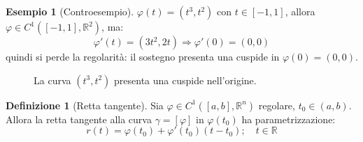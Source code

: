 \documentclass[11pt, a4paper, openright]{book}
\theoremstyle{plain}
\theoremstyle{definition}
\newtheorem{definizione}[teorema]{Definizione}
\newtheorem{esempio}[teorema]{Esempio}
\theoremstyle{remark}
\begin{document}
\begin{esempio}[Controesempio]
    $\varphi(t) = (t^3, t^2)$ con $t \in [-1, 1]$, allora $\varphi \in C^1([-1, 1], \mathbb{R}^2)$, ma:
    \begin{equation}
        \varphi'(t) = (3t^2, 2t) \Longrightarrow \varphi'(0) = (0, 0)
    \end{equation}
    quindi si perde la regolarità: il sostegno presenta una cuspide in $\varphi(0) = (0, 0)$.
\begin{figure}[H]
    \centering
    \caption{La curva $(t^3, t^2)$ presenta una cuspide nell'origine.}
\end{figure}
\end{esempio}

\begin{definizione}[Retta tangente]
    Sia $\varphi \in C^1([a, b], \mathbb{R}^n)$ regolare, $t_0 \in (a, b)$. Allora la retta tangente alla curva $\gamma = [\varphi]$ in $\varphi(t_0)$ ha parametrizzazione:
    \begin{equation}
        r(t) = \varphi(t_0) + \varphi'(t_0)(t - t_0); \quad t \in \mathbb{R}
    \end{equation}
\end{definizione}
\end{document}
